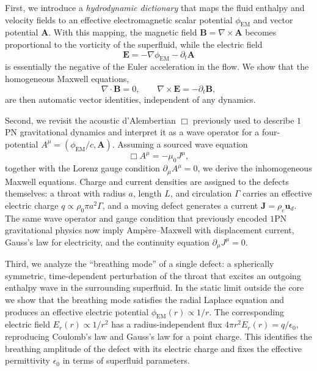 \documentclass[11pt]{article}
\begin{document}
First, we introduce a \emph{hydrodynamic dictionary} that maps the fluid enthalpy and velocity fields to an effective electromagnetic scalar potential $\phi_{\mathrm{EM}}$ and vector potential $\mathbf{A}$.  With this mapping, the magnetic field $\mathbf{B} = \nabla \times \mathbf{A}$ becomes proportional to the vorticity of the superfluid, while the electric field
\begin{equation}
\mathbf{E} = -\nabla \phi_{\mathrm{EM}} - \partial_t \mathbf{A}
\end{equation}
is essentially the negative of the Euler acceleration in the flow.  We show that the homogeneous Maxwell equations,
\begin{equation}
\nabla \cdot \mathbf{B} = 0,
\qquad
\nabla \times \mathbf{E} = -\partial_t \mathbf{B},
\end{equation}
are then automatic vector identities, independent of any dynamics.

Second, we revisit the acoustic d'Alembertian $\Box$ previously used to describe $1$PN gravitational dynamics and interpret it as a wave operator for a four-potential $A^\mu = (\phi_{\mathrm{EM}}/c,\mathbf{A})$.  Assuming a sourced wave equation
\begin{equation}
\Box A^\mu = -\mu_0 J^\mu,
\end{equation}
together with the Lorenz gauge condition $\partial_\mu A^\mu = 0$, we derive the inhomogeneous Maxwell equations.  Charge and current densities are assigned to the defects themselves: a throat with radius $a$, length $L$, and circulation $\Gamma$ carries an effective electric charge $q \propto \rho_0 \pi a^2 \Gamma$, and a moving defect generates a current $\mathbf{J} = \rho_e \mathbf{u}_d$.  The same wave operator and gauge condition that previously encoded $1$PN gravitational physics now imply Ampère--Maxwell with displacement current, Gauss's law for electricity, and the continuity equation $\partial_\mu J^\mu = 0$.

Third, we analyze the ``breathing mode'' of a single defect: a spherically symmetric, time-dependent perturbation of the throat that excites an outgoing enthalpy wave in the surrounding superfluid.  In the static limit outside the core we show that the breathing mode satisfies the radial Laplace equation and produces an effective electric potential $\phi_{\mathrm{EM}}(r) \propto 1/r$.  The corresponding electric field $E_r(r) \propto 1/r^2$ has a radius-independent flux $4\pi r^2 E_r(r) = q/\epsilon_0$, reproducing Coulomb's law and Gauss's law for a point charge.  This identifies the breathing amplitude of the defect with its electric charge and fixes the effective permittivity $\epsilon_0$ in terms of superfluid parameters.
\end{document}
